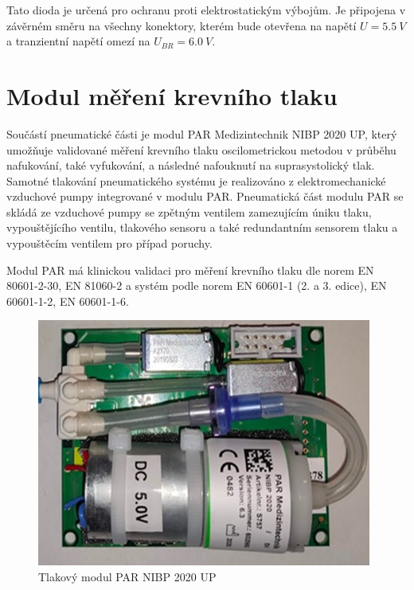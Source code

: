 Tato dioda je určená pro ochranu proti elektrostatickým výbojům. Je připojena v závěrném směru na všechny konektory, kterém bude otevřena na napětí
$U = 5.5 \ V $ a tranzientní napětí omezí na $U_{BR} = 6.0 \ V $.

\section{Modul měření krevního tlaku}

Součástí pneumatické části je modul PAR Medizintechnik NIBP 2020 UP, který umožňuje validované měření krevního tlaku oscilometrickou metodou v průběhu nafukování, také vyfukování, a následné nafouknutí na suprasystolický tlak. Samotné tlakování pneumatického systému je realizováno z elektromechanické vzduchové pumpy integrované v modulu PAR.
Pneumatická část modulu PAR se skládá ze vzduchové pumpy se zpětným ventilem zamezujícím úniku tlaku, vypouštějícího ventilu, tlakového sensoru a také redundantním sensorem tlaku a vypouštěcím ventilem pro případ poruchy. \par
Modul PAR má klinickou validaci pro měření krevního tlaku dle norem EN 80601-2-30, EN 81060-2 a systém podle norem EN 60601-1 (2. a 3. edice), EN 60601-1-2, EN 60601-1-6.
\begin{figure}[H]
    \centering
    \includegraphics{pictures/par_nibp_up.jpg}
    \caption{Tlakový modul PAR NIBP 2020 UP}
    \label{fig:par_modul}
\end{figure}

